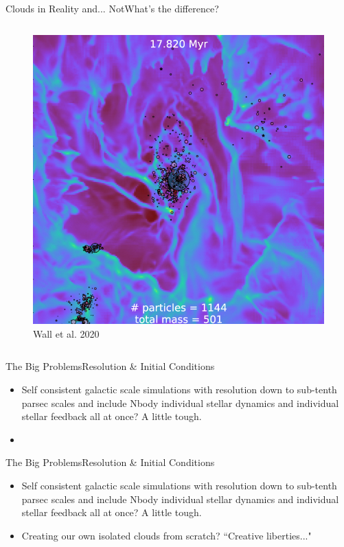 \documentclass[aspectratio=169]{beamer}
\begin{document}
\begin{frame}{Clouds in Reality and... Not}{What's the difference?}
\begin{columns}
\begin{column}{0.35\textwidth}
\begin{figure}[h!]
                \includegraphics[width=\linewidth]{../images/josh_torch_run.jpeg} \\
                Wall et al. 2020
                \label{fig:torch}
            \end{figure}
        \end{column}
    \end{columns}
\end{frame} 
%
%
%
%
%
\begin{frame}{The Big Problems}{Resolution \& Initial Conditions}
    \begin{itemize}
        \item Self consistent galactic scale simulations with resolution down to sub-tenth parsec scales and include Nbody individual stellar dynamics and individual stellar feedback all at once? A little tough.
        \item []
    \end{itemize}
\end{frame}
%
%
%
%
% 
\begin{frame}{The Big Problems}{Resolution \& Initial Conditions}
    \begin{itemize}
        \item Self consistent galactic scale simulations with resolution down to sub-tenth parsec scales and include Nbody individual stellar dynamics and individual stellar feedback all at once? A little tough.
        \item Creating our own isolated clouds from scratch? ``Creative liberties..."
    \end{itemize}
\end{frame}
%
%
%
\end{document}
